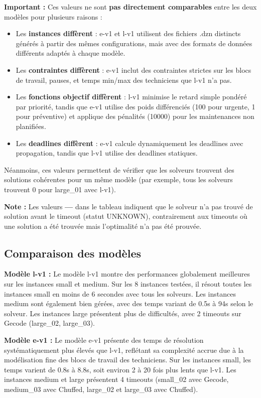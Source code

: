 \textbf{Important :} Ces valeurs ne sont \textbf{pas directement comparables} entre les deux modèles pour plusieurs raisons :
\begin{itemize}
	\item Les \textbf{instances diffèrent} : e-v1 et l-v1 utilisent des fichiers .dzn distincts générés à partir des mêmes configurations, mais avec des formats de données différents adaptés à chaque modèle.
	\item Les \textbf{contraintes diffèrent} : e-v1 inclut des contraintes strictes sur les blocs de travail, pauses, et temps min/max des techniciens que l-v1 n'a pas.
	\item Les \textbf{fonctions objectif diffèrent} : l-v1 minimise le retard simple pondéré par priorité, tandis que e-v1 utilise des poids différenciés (100 pour urgente, 1 pour préventive) et applique des pénalités (10000) pour les maintenances non planifiées.
	\item Les \textbf{deadlines diffèrent} : e-v1 calcule dynamiquement les deadlines avec propagation, tandis que l-v1 utilise des deadlines statiques.
\end{itemize}

Néanmoins, ces valeurs permettent de vérifier que les solveurs trouvent des solutions cohérentes pour un même modèle (par exemple, tous les solveurs trouvent 0 pour large\_01 avec l-v1). 

\textbf{Note :} Les valeurs \textbf{---} dans le tableau indiquent que le solveur n'a pas trouvé de solution avant le timeout (statut UNKNOWN), contrairement aux timeouts où une solution a été trouvée mais l'optimalité n'a pas été prouvée.

\subsection{Comparaison des modèles}

\textbf{Modèle l-v1 :} Le modèle l-v1 montre des performances globalement meilleures sur les instances small et medium. Sur les 8 instances testées, il résout toutes les instances small en moins de 6 secondes avec tous les solveurs. Les instances medium sont également bien gérées, avec des temps variant de 0.5s à 94s selon le solveur. Les instances large présentent plus de difficultés, avec 2 timeouts sur Gecode (large\_02, large\_03).

\textbf{Modèle e-v1 :} Le modèle e-v1 présente des temps de résolution systématiquement plus élevés que l-v1, reflétant sa complexité accrue due à la modélisation fine des blocs de travail des techniciens. Sur les instances small, les temps varient de 0.8s à 8.8s, soit environ 2 à 20 fois plus lents que l-v1. Les instances medium et large présentent 4 timeouts (small\_02 avec Gecode, medium\_03 avec Chuffed, large\_02 et large\_03 avec Chuffed).

